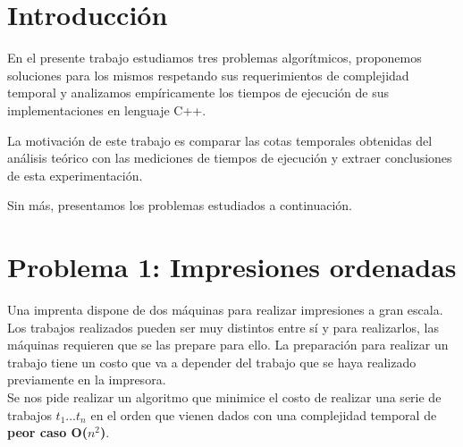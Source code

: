 \documentclass[a4paper, 10pt, twoside]{article}
\begin{document}
\newpage




\tableofcontents

\newpage




\section{Introducción}

En el presente trabajo estudiamos tres problemas algorítmicos, proponemos soluciones para los mismos respetando sus requerimientos de complejidad temporal y analizamos empíricamente los tiempos de ejecución de sus implementaciones en lenguaje C++.

La motivación de este trabajo es comparar las cotas temporales obtenidas del análisis teórico con las mediciones de tiempos de ejecución y extraer conclusiones de esta experimentación.

Sin más, presentamos los problemas estudiados a continuación.




\newpage

\section{Problema 1: Impresiones ordenadas}

Una imprenta dispone de dos máquinas para realizar impresiones a gran escala. Los trabajos realizados pueden ser muy distintos entre sí y para realizarlos, las máquinas requieren que se las prepare para ello. La preparación para realizar un trabajo tiene un costo que va a depender del trabajo que se haya realizado previamente en la impresora.\\

Se nos pide realizar un algoritmo que minimice el costo de realizar una serie de trabajos $t_1$...$t_n$ en el orden que vienen dados con una complejidad temporal de \textbf{peor caso O($n^2$)}.
\end{document}
